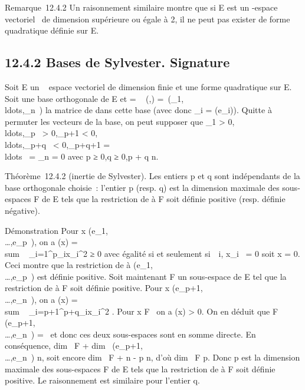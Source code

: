 \documentclass[]{article}
\begin{document}
Remarque~12.4.2 Un raisonnement similaire montre que si E est un
-espace vectoriel ~de dimension supérieure ou égale à 2, il ne peut pas
exister de forme quadratique définie sur E.

\subsection{12.4.2 Bases de Sylvester. Signature}

Soit E un ~ espace vectoriel de dimension finie et \Phi une forme
quadratique sur E. Soit  une base orthogonale de E et \Omega
= \mathrmMat~ (\Phi,)
=\
\mathrmdiag(\alpha_1,\\ldots,\alpha_n~)
la matrice de \Phi dans cette base (avec donc \alpha_i =
\Phi(e_i)). Quitte à permuter les vecteurs de la base, on peut
supposer que \alpha_1 >
0,\\ldots,\alpha_p~
> 0,\alpha_p+1 <
0,\\ldots,\alpha_p+q~
< 0,\alpha_p+q+1 =
\\ldots~ =
\alpha_n = 0 avec p ≥ 0,q ≥ 0,p + q \leq n.

Théorème~12.4.2 (inertie de Sylvester). Les entiers p et q sont
indépendants de la base orthogonale choisie~: l'entier p (resp. q) est
la dimension maximale des sous-espaces F de E tels que la restriction de
\Phi à F soit définie positive (resp. définie négative).

Démonstration Pour x
\in\mathrmVect(e_1,\\\ldots,e_p~),
on a \Phi(x) = \\sum ~
_i=1^p\alpha_ix_i^2 ≥ 0 avec égalité
si et seulement si~\forall~i, x_i~ = 0 soit x
= 0. Ceci montre que la restriction de \Phi à
\mathrmVect(e_1,\\\ldots,e_p~)
est définie positive. Soit maintenant F un sous-espace de E tel que la
restriction de \Phi à F soit définie positive. Pour x
\in\mathrmVect(e_p+1,\\\ldots,e_n~),
on a \Phi(x) = \\sum ~
_i=p+1^p+q\alpha_ix_i^2 . Pour x \in
F \diagdown\0\ on a \Phi(x) > 0. On
en déduit que F
\bigcap\mathrmVect(e_p+1,\\\ldots,e_n~)
= \0\ et donc ces deux sous-espaces
sont en somme directe. En conséquence, dim~ F
+ dim~
\mathrmVect(e_p+1,\\\ldots,e_n~)
\leq n, soit encore dim~ F + n - p \leq n, d'où
dim~ F \leq p. Donc p est la dimension maximale
des sous-espaces F de E tels que la restriction de \Phi à F soit définie
positive. Le raisonnement est similaire pour l'entier q.
\end{document}

